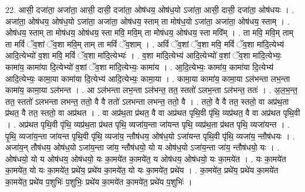\documentclass[17pt]{extarticle}
\begin{document}
22. आसी॒ दजा॑ता॒ अजा॑ता॒ आसी॒ दासी॒ दजा॑ता॒ ओष॑धय॒ ओष॑ध॒यो ऽजा॑ता॒ आसी॒ दासी॒ दजा॑ता॒ ओष॑धयः । . अजा॑ता॒ ओष॑धय॒ ओष॑ध॒यो ऽजा॑ता॒ अजा॑ता॒ ओष॑धय॒ स्ताम् ता मोष॑ध॒यो ऽजा॑ता॒ अजा॑ता॒ ओष॑धय॒ स्ताम् । . ओष॑धय॒ स्ताम् ता मोष॑धय॒ ओष॑धय॒ स्ता मवि॒ मवि॒म् ता मोष॑धय॒ ओष॑धय॒ स्ता मवि᳚म् । . ता मवि॒ मवि॒म् ताम् ता मविं॑ ॅव॒शां ॅव॒शा मवि॒म् ताम् ता मविं॑ ॅव॒शाम् । . अविं॑ ॅव॒शां ॅव॒शा मवि॒ मविं॑ ॅव॒शा मा॑दि॒त्येभ्य॑ आदि॒त्येभ्यो॑ व॒शा मवि॒ मविं॑ ॅव॒शा मा॑दि॒त्येभ्यः॑ । . व॒शा मा॑दि॒त्येभ्य॑ आदि॒त्येभ्यो॑ व॒शां ॅव॒शा मा॑दि॒त्येभ्यः॒ कामा॑य॒ कामा॑या दि॒त्येभ्यो॑ व॒शां ॅव॒शा मा॑दि॒त्येभ्यः॒ कामा॑य । . आ॒दि॒त्येभ्यः॒ कामा॑य॒ कामा॑या दि॒त्येभ्य॑ आदि॒त्येभ्यः॒ कामा॒या कामा॑या दि॒त्येभ्य॑ आदि॒त्येभ्यः॒ कामा॒या । . कामा॒या कामा॑य॒ कामा॒या ऽल॑भन्ता लभ॒न्ता कामा॑य॒ कामा॒या ऽल॑भन्त । . आ ऽल॑भन्ता लभ॒न्ता ऽल॑भन्त॒ तत॒ स्ततो॑ ऽलभ॒न्ता ऽल॑भन्त॒ ततः॑ । . अ॒ल॒भ॒न्त॒ तत॒ स्ततो॑ ऽलभन्ता लभन्त॒ ततो॒ वै वै ततो॑ ऽलभन्ता लभन्त॒ ततो॒ वै । . ततो॒ वै वै तत॒ स्ततो॒ वा अप्र॑थ॒ता प्र॑थत॒ वै तत॒ स्ततो॒ वा अप्र॑थत । . वा अप्र॑थ॒ता प्र॑थत॒ वै वा अप्र॑थत पृथि॒वी पृ॑थि॒ व्यप्र॑थत॒ वै वा अप्र॑थत पृथि॒वी । . अप्र॑थत पृथि॒वी पृ॑थि॒ व्यप्र॑थ॒ता प्र॑थत पृथि॒ व्यजा॑य॒न्ता जा॑यन्त पृथि॒ व्यप्र॑थ॒ता प्र॑थत पृथि॒ व्यजा॑यन्त । . पृ॒थि॒ व्यजा॑य॒न्ता जा॑यन्त पृथि॒वी पृ॑थि॒ व्यजा॑य॒ न्तौष॑धय॒ ओष॑ध॒यो ऽजा॑यन्त पृथि॒वी पृ॑थि॒ व्यजा॑य॒ न्तौष॑धयः । . अजा॑य॒न् तौष॑धय॒ ओष॑ध॒यो ऽजा॑य॒न्ता जा॑य॒ न्तौष॑धयो॒ यो य ओष॑ध॒यो ऽजा॑य॒न्ता जा॑य॒ न्तौष॑धयो॒ यः । . ओष॑धयो॒ यो य ओष॑धय॒ ओष॑धयो॒ यः का॒मये॑त का॒मये॑त॒ य ओष॑धय॒ ओष॑धयो॒ यः का॒मये॑त । . यः का॒मये॑त का॒मये॑त॒ यो यः का॒मये॑त॒ प्रथे॑य॒ प्रथे॑य का॒मये॑त॒ यो यः का॒मये॑त॒ प्रथे॑य । . का॒मये॑त॒ प्रथे॑य॒ प्रथे॑य का॒मये॑त का॒मये॑त॒ प्रथे॑य प॒शुभिः॑ प॒शुभिः॒ प्रथे॑य का॒मये॑त का॒मये॑त॒ प्रथे॑य प॒शुभिः॑ । \newline
\end{document}
